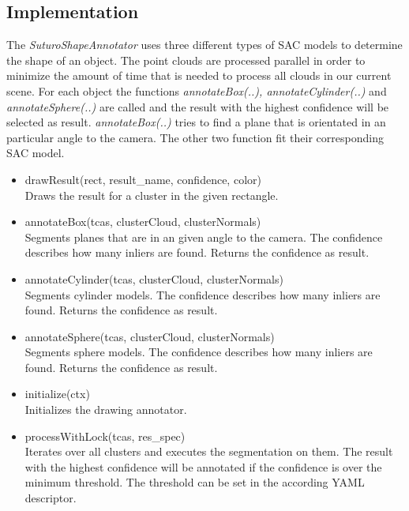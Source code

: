 \documentclass[main.tex]{subfiles}
\begin{document}
\subsection{Implementation}
The \textit{SuturoShapeAnnotator} uses three different types of SAC models to determine the shape of an object.
The point clouds are processed parallel in order to minimize the amount of time that is needed to process all clouds in our current scene.
For each object the functions \textit{annotateBox(..), annotateCylinder(..)} and \textit{annotateSphere(..)} are called and the result with the highest confidence
will be selected as result. \textit{annotateBox(..)} tries to find a plane that is orientated in an particular angle to the camera. 
The other two function fit their corresponding SAC model.

\begin{itemize}
\item drawResult(rect, result\_name, confidence, color)\\
Draws the result for a cluster in the given rectangle.

\item annotateBox(tcas, clusterCloud, clusterNormals)\\
Segments planes that are in an given angle to the camera. The confidence describes how many inliers are found. Returns the confidence as result.

\item annotateCylinder(tcas, clusterCloud, clusterNormals)\\
Segments cylinder models. The confidence describes how many inliers are found. Returns the confidence as result.

\item annotateSphere(tcas, clusterCloud, clusterNormals)\\
Segments sphere models. The confidence describes how many inliers are found. Returns the confidence as result.

\item initialize(ctx)\\
Initializes the drawing annotator.

\item processWithLock(tcas, res\_spec)\\
Iterates over all clusters and executes the segmentation on them. The result with the highest confidence will be annotated if
the confidence is over the minimum threshold. The threshold can be set in the according YAML descriptor.
\end{itemize}
\end{document}
